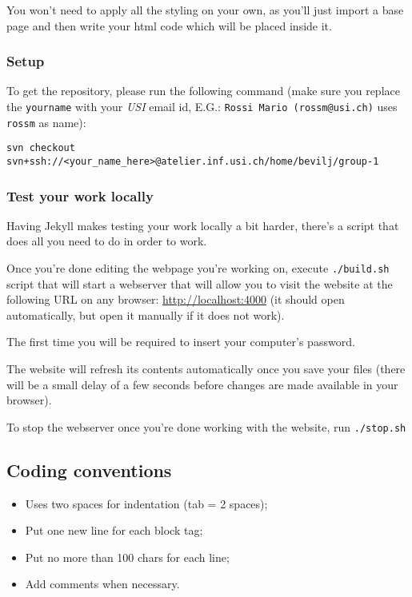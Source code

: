 \documentclass[hidelinks,12pt,a4paper,numbers=enddot]{scrartcl}
\begin{document}
You won't need to apply all the styling on your own, as you'll just
import a base page and then write your html code which will be placed inside it.

\subsubsection{Setup}\label{setup}

To get the repository, please run the following command (make sure you
replace the \texttt{yourname} with your \emph{USI} email id,
E.G.: \texttt{Rossi\ Mario\ (rossm@usi.ch)} uses
\texttt{rossm} as name):

\begin{verbatim}
svn checkout svn+ssh://<your_name_here>@atelier.inf.usi.ch/home/bevilj/group-1
\end{verbatim}

\subsubsection{Test your work locally}\label{test-your-work-locally}

Having Jekyll makes testing your work locally a bit harder, there's a
script that does all you need to do in order to work.

Once you're done editing the webpage you're working on, execute
\texttt{./build.sh} script that will start a webserver that will allow you
to visit the website at the following URL on any browser:
\url{http://localhost:4000} (it should open automatically, but open it
manually if it does not work).

The first time you will be required to insert your computer's password.

The website will refresh its contents automatically once you save your
files (there will be a small delay of a few seconds before changes are
made available in your browser).

To stop the webserver once you're done working with the website,
run \texttt{./stop.sh}

\subsection{Coding conventions}\label{coding-conventions}

\begin{itemize}
\item
  Uses two spaces for indentation (tab = 2 spaces);
\item
  Put one new line for each block tag;
\item
  Put no more than 100 chars for each line;
\item
  Add comments when necessary.
\end{itemize}
\end{document}
